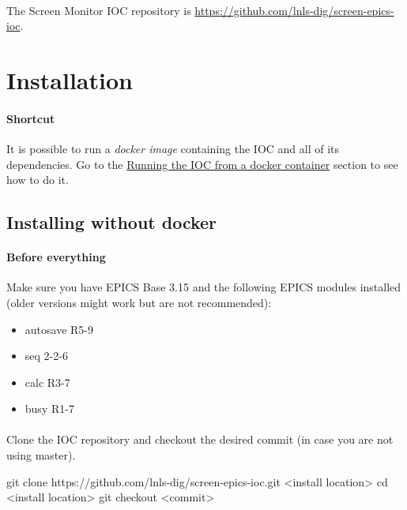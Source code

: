 \documentclass[openany]{article}
\begin{document}
\paragraph{} The Screen Monitor IOC repository is \url{https://github.com/lnls-dig/screen-epics-ioc}.

\section{Installation}

    \paragraph{Shortcut} It is possible to run a \emph{docker image} containing the IOC and all of its dependencies. Go to the \hyperref[sec:run-with-docker]{Running the IOC from a docker container} section to see how to do it.

    \subsection{Installing without docker}

        \paragraph{Before everything} Make sure you have EPICS Base 3.15 and the following EPICS modules installed (older versions might work but are not recommended):

        \begin{itemize}
          \item autosave R5-9
          \item seq 2-2-6
          \item calc R3-7
          \item busy R1-7
        \end{itemize} 

        \paragraph{} Clone the IOC repository and checkout the desired commit (in case you are not using master).

            \vspace{1mm}
            \begin{code}
git clone https://github.com/lnls-dig/screen-epics-ioc.git <install location>
cd <install location>
git checkout <commit>
            \end{code}
            \vspace{1mm}
\end{document}
